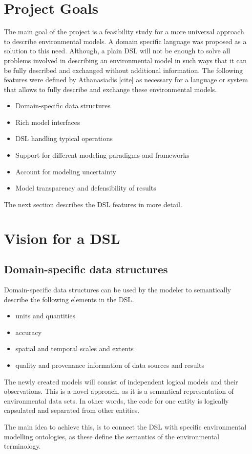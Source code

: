 \section{Project Goals}
\par
The main goal of the project is a feasibility study for a more universal approach to describe environmental models. A domain specific language was proposed as a solution to this need. Although, a plain DSL will not be enough to solve all problems involved in describing an environmental model in such ways that it can be fully described and exchanged without additional information. The following features were defined by Athanasiadis [cite] as necessary for a language or system that allows to fully describe and exchange these environmental models.
\begin{itemize}
	\item Domain-specific data structures
	\item Rich model interfaces    
	\item DSL handling typical operations
	\item Support for different modeling paradigms and frameworks
	\item Account for modeling uncertainty    
	\item Model transparency and defensibility of results 
\end{itemize}
The next section describes the DSL features in more detail.

\section{Vision for a DSL} \label{sec:vision_for_a_dsl}


\subsection{Domain-specific data structures}
\par
Domain-specific data structures can be used by the modeler to semantically describe the following elements in the DSL.
\begin{itemize}
	\item    units and quantities
	\item    accuracy
	\item    spatial and temporal scales and extents
	\item    quality and provenance information of data sources and results
\end{itemize}
\par
The newly created models will consist of independent logical models and their observations. This is a novel approach, as it is a semantical representation of environmental data sets. In other words, the code for one entity is logically capsulated and separated from other entities.
\par
The main idea to achieve this, is to connect the DSL with specific environmental modelling ontologies, as these define the semantics of the environmental terminology.

